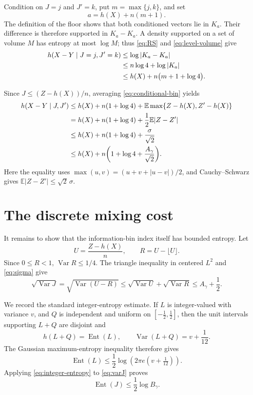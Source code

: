 \documentclass[11pt]{article}
\newcommand{\Var}{\operatorname{Var}}
\newcommand{\Ent}{\operatorname{Ent}}
\begin{document}
Condition on $J=j$ and $J'=k$, put $m=\max\{j,k\}$, and set
\[
 a=h(X)+n(m+1).
\]
The definition of the floor shows that both conditioned vectors lie in
$K_a$.  Their difference is therefore supported in $K_a-K_a$.  A density
supported on a set of volume $M$ has entropy at most $\log M$; thus
\eqref{eq:RS} and \eqref{eq:level-volume} give
\begin{align}
 h(X-Y\mid J=j,J'=k)
 &\le \log|K_a-K_a|\notag\\
 &\le n\log4+\log|K_a|\notag\\
 &\le h(X)+n\bigl(m+1+\log4\bigr).\label{eq:conditional-bin}
\end{align}

Since $J\le (Z-h(X))/n$, averaging \eqref{eq:conditional-bin} yields
\begin{align}
 h(X-Y\mid J,J')
 &\le h(X)+n(1+\log4)
       +\mathbb E\max\{Z-h(X),Z'-h(X)\}\notag\\
 &=h(X)+n(1+\log4)+\frac12\mathbb E|Z-Z'|\notag\\
 &\le h(X)+n(1+\log4)+\frac\sigma{\sqrt2}\notag\\
 &\le h(X)+n\biggl(1+\log4+\frac{A_\gamma}{\sqrt2}\biggr).
 \label{eq:conditional-average}
\end{align}
Here the equality uses
$\max(u,v)=(u+v+|u-v|)/2$, and Cauchy--Schwarz gives
$\mathbb E|Z-Z'|\le\sqrt{2}\,\sigma$.

\section{The discrete mixing cost}

It remains to show that the information-bin index itself has bounded entropy.
Let
\[
 U=\frac{Z-h(X)}n,\qquad R=U-\lfloor U\rfloor.
\]
Since $0\le R<1$, $\Var R\le1/4$.  The triangle inequality in centered
$L^2$ and \eqref{eq:sigma} give
\begin{equation}\label{eq:varJ}
 \sqrt{\Var J}=\sqrt{\Var(U-R)}
 \le\sqrt{\Var U}+\sqrt{\Var R}
 \le A_\gamma+\frac12.
\end{equation}

We record the standard integer-entropy estimate.  If $L$ is integer-valued
with variance $v$, and $Q$ is independent and uniform on
$[-\tfrac12,\tfrac12]$, then the unit intervals supporting $L+Q$ are
disjoint and
\[
 h(L+Q)=\Ent(L),\qquad \Var(L+Q)=v+\frac1{12}.
\]
The Gaussian maximum-entropy inequality therefore gives
\begin{equation}\label{eq:integer-entropy}
 \Ent(L)\le\frac12\log\left(2\pi e(v+\tfrac1{12})\right).
\end{equation}
Applying \eqref{eq:integer-entropy} to \eqref{eq:varJ} proves
\begin{equation}\label{eq:HJ}
 \Ent(J)\le\frac12\log B_\gamma.
\end{equation}
\end{document}
